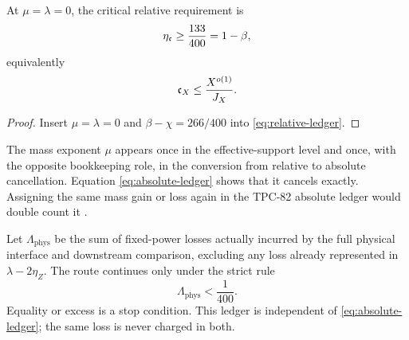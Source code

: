 \begin{corollary}
\label{cor:natural-corner}
At \(\mu=\lambda=0\), the critical relative requirement is
\[
 \eta_{\mathfrak c}\ge\frac{133}{400}=1-\beta,
\]
equivalently
\[
 \mathfrak c_X\le\frac{X^{o(1)}}{J_X}.
\]
\end{corollary}

\begin{proof}
Insert \(\mu=\lambda=0\) and
\(\beta-\chi=266/400\) into
\eqref{eq:relative-ledger}.
\end{proof}

\begin{remark}
The mass exponent \(\mu\) appears once in the effective-support level
and once, with the opposite bookkeeping role, in the conversion from
relative to absolute cancellation.  Equation
\eqref{eq:absolute-ledger} shows that it cancels exactly.  Assigning
the same mass gain or loss again in the TPC-82 absolute ledger would
double count it \citep{WangTPC82}.
\end{remark}

\begin{definition}
\label{def:physical-loss-ledger}
Let \(\Lambda_{\mathrm{phys}}\) be the sum of fixed-power losses
actually incurred by the full physical interface and downstream
comparison, excluding any loss already represented in
\(\lambda-2\eta_Z\).  The route continues only under the strict rule
\[
 \boxed{\Lambda_{\mathrm{phys}}<\frac1{400}.}
\]
Equality or excess is a stop condition.  This ledger is independent
of \eqref{eq:absolute-ledger}; the same loss is never charged in
both.
\end{definition}
